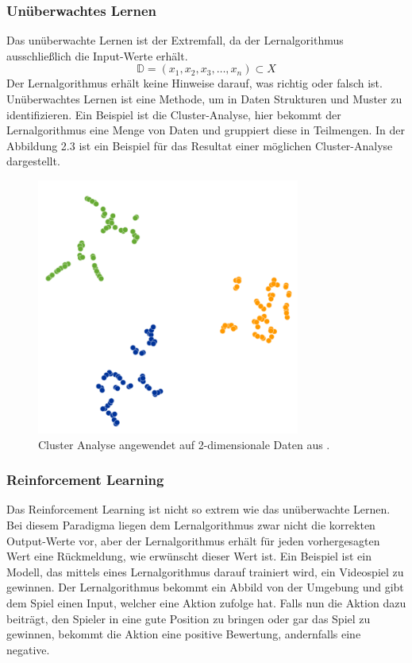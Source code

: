 \documentclass[12pt,letterpaper,ngerman]{article}
\begin{document}
\subsubsection{Unüberwachtes Lernen}
Das unüberwachte Lernen ist der Extremfall, da der Lernalgorithmus
ausschließlich die Input-Werte erhält.
\[\mathbb{D} = (x_1, x_2, x_3, \dots, x_n) \subset X\]
Der Lernalgorithmus erhält keine Hinweise darauf, was richtig oder falsch 
ist. Unüberwachtes Lernen ist eine Methode, um in Daten Strukturen und 
Muster zu identifizieren. Ein Beispiel ist die Cluster-Analyse, hier
bekommt der Lernalgorithmus eine Menge von Daten und gruppiert diese in
Teilmengen. In der Abbildung 2.3 ist ein Beispiel für das Resultat einer
möglichen Cluster-Analyse dargestellt.
\begin{figure}[H]
  \centering
  \includegraphics[scale=0.3]{abb/t-sne-example.png}
  \caption{Cluster Analyse angewendet auf 2-dimensionale Daten aus 
  \cite{wattenberg2016how}.}
\end{figure}

\subsubsection{Reinforcement Learning}
Das Reinforcement Learning ist nicht so extrem wie das unüberwachte Lernen. 
Bei diesem Paradigma liegen dem Lernalgorithmus zwar nicht die korrekten 
Output-Werte vor, aber der Lernalgorithmus erhält für jeden vorhergesagten Wert 
eine Rückmeldung, wie erwünscht dieser Wert ist. Ein Beispiel ist ein Modell,
das mittels eines Lernalgorithmus darauf trainiert wird, ein Videospiel zu 
gewinnen. Der Lernalgorithmus bekommt ein Abbild von der Umgebung und gibt dem 
Spiel einen Input, welcher eine Aktion zufolge hat. Falls nun die Aktion dazu 
beiträgt, den Spieler in eine gute Position zu bringen oder gar das Spiel zu
gewinnen, bekommt die Aktion eine positive Bewertung, andernfalls eine
negative. 
\end{document}

